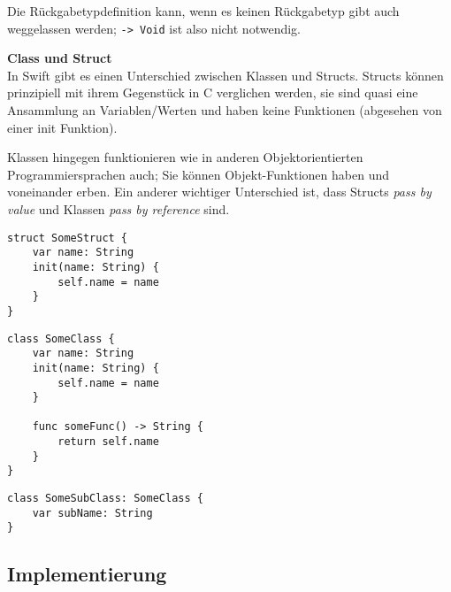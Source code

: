 Die Rückgabetypdefinition kann, wenn es keinen Rückgabetyp gibt auch weggelassen werden; \texttt{-> Void} ist also nicht notwendig.


\textbf{Class und Struct} \\
In Swift gibt es einen Unterschied zwischen Klassen und Structs. Structs können prinzipiell mit ihrem Gegenstück in C verglichen werden, sie sind quasi eine Ansammlung an Variablen/Werten und haben keine Funktionen (abgesehen von einer init Funktion).

Klassen hingegen funktionieren wie in anderen Objektorientierten Programmiersprachen auch; Sie können Objekt-Funktionen haben und voneinander erben.
Ein anderer wichtiger Unterschied ist, dass Structs \emph{pass by value} und Klassen \emph{pass by reference} sind.

\begin{lstlisting}[caption=Beispiel Structdefinition]
struct SomeStruct {
    var name: String
    init(name: String) {
        self.name = name
    }
}
\end{lstlisting}

\begin{lstlisting}[caption=Beispiel Klassendefinition]
class SomeClass {
    var name: String
    init(name: String) {
        self.name = name
    }
    
    func someFunc() -> String {
        return self.name
    }
}
\end{lstlisting}

\begin{lstlisting}[caption=Beispiel Subklassendefinition von SomeClass]
class SomeSubClass: SomeClass {
    var subName: String
}
\end{lstlisting}


\subsection{Implementierung}
\label{sec:Implementierung}


